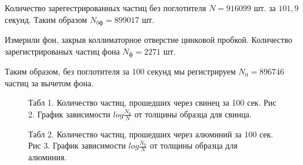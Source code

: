 \documentclass[12pt]{article}
\begin{document}
  \vspace{0.2cm}

  Количество зарегестрированных частиц без поглотителя $N = 916099$ шт. за
  $101,9$ секунд.
  Таким образом $N_{0ф} = 899017$ шт.

  Измерили фон, закрыв коллиматорное отверстие цинковой пробкой.
  Количество зарегистрированых частиц фона $N_ф = 2271$ шт.

  Таким образом, без поглотителя за 100 секунд мы регистрируем $N_0 = 896746$
  частиц за вычетом фона.

  \begin {figure}[h!]
    \begin{minipage}[h]{0.49\linewidth}
      Табл 1. Количество частиц, прошедших через свинец за 100 сек.
      Рис 2. График зависимости $log\frac{N_0}{N}$ от толщины образца для
      свинца.
    \end{minipage}
    \hspace{0.5cm}
    \begin{minipage}[h]{0.49\linewidth}
      Табл 2. Количество частиц, прошедших через алюминий за 100 сек.
      Рис 3. График зависимости $log\frac{N_0}{N}$ от толщины образца для
      алюминия.
    \end{minipage}
    \label {fig:plumbum-aluminium}
  \end {figure}
\end{document}
